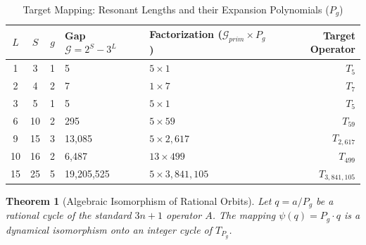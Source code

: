 \documentclass[11pt, a4paper]{article}
\newtheorem{theorem}{Theorem}[section]
\theoremstyle{definition}
\begin{document}
\begin{table}[htbp]
\centering
\caption{Target Mapping: Resonant Lengths and their Expansion Polynomials ($P_g$)}
\label{tab:target_mapping}
\begin{tabular}{cccllr}
\toprule
$L$ & $S$ & $g$ & Gap \(\mathcal{G} = 2^S - 3^L\) & Factorization (\(\mathcal{G}_{prim} \times P_g\)) & Target Operator \\ \midrule
1   & 3   & 1   & 5                               & $5 \times 1$                                      & $T_{5}$         \\
2   & 4   & 2   & 7                               & $1 \times 7$                                      & $T_{7}$         \\
3   & 5   & 1   & 5                               & $5 \times 1$                                      & $T_{5}$         \\
6   & 10  & 2   & 295                             & $5 \times 59$                                     & $T_{59}$        \\
9   & 15  & 3   & 13,085                          & $5 \times 2,617$                                  & $T_{2,617}$     \\
10  & 16  & 2   & 6,487                           & $13 \times 499$                                   & $T_{499}$       \\
15  & 25  & 5   & 19,205,525                      & $5 \times 3,841,105$                              & $T_{3,841,105}$ \\
\bottomrule
\end{tabular}
\end{table}

\begin{theorem}[Algebraic Isomorphism of Rational Orbits]
\label{thm:pg_iso}
Let $q = a/P_g$ be a rational cycle of the standard $3n+1$ operator $A$. The mapping \(\psi(q) = P_g \cdot q\) is a dynamical isomorphism onto an integer cycle of $T_{P_g}$.
\end{theorem}
\end{document}
